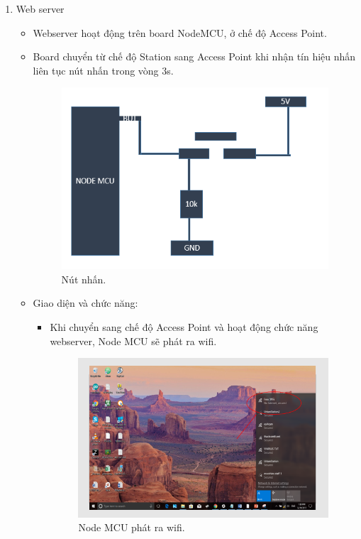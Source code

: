 \documentclass[a4paper,12pt,oneside]{article}
\begin{document}
\begin{enumerate}
	\item Web server
	\begin{itemize}
		\item Webserver hoạt động trên board NodeMCU, ở chế độ Access Point.
		\item Board chuyển từ chế độ Station sang Access Point khi nhận tín hiệu nhấn liên tục nút nhấn trong vòng 3s.
			\begin{figure}[H]
			\centering
			\includegraphics[scale=.9]{hinh/node_button.PNG}
			\caption{Nút nhấn.}
			\end{figure}
		\item Giao diện và chức năng:
		\begin{itemize}
			\item Khi chuyển sang chế độ Access Point và hoạt động chức năng webserver, Node MCU sẽ phát ra wifi.
			\begin{figure}[H]
			\centering
			\includegraphics[scale=.85]{hinh/webserver_1.PNG}
			\caption{Node MCU phát ra wifi.}
			\end{figure}
			

\end{itemize}
\end{itemize}
\end{enumerate}
\end{document}
